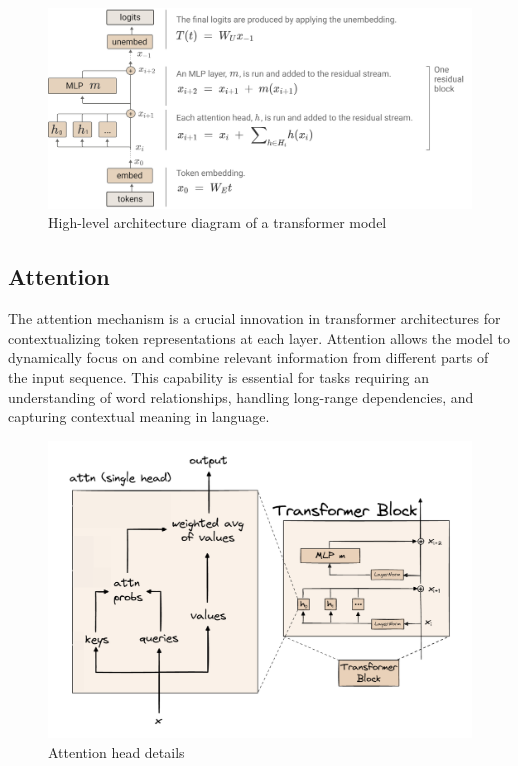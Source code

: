 \begin{figure}[ht]
    \centering
    \includegraphics[width=1\textwidth]
    {transformer_architecture.png}
    \caption{High-level architecture diagram of a transformer model \cite{nanda_mathematical_nodate}}
    \label{fig:enter-label}
\end{figure}

\newpage
\subsection{Attention}
The attention mechanism is a crucial innovation in transformer architectures for contextualizing token representations at each layer. Attention allows the model to dynamically focus on and combine relevant information from different parts of the input sequence. This capability is essential for tasks requiring an understanding of word relationships, handling long-range dependencies, and capturing contextual meaning in language.

\begin{figure}[h]
    \centering
    \includegraphics[width=0.85\linewidth]{attention.png}
    \caption{Attention head details \cite{colab_transformer_2024}}
\end{figure}

